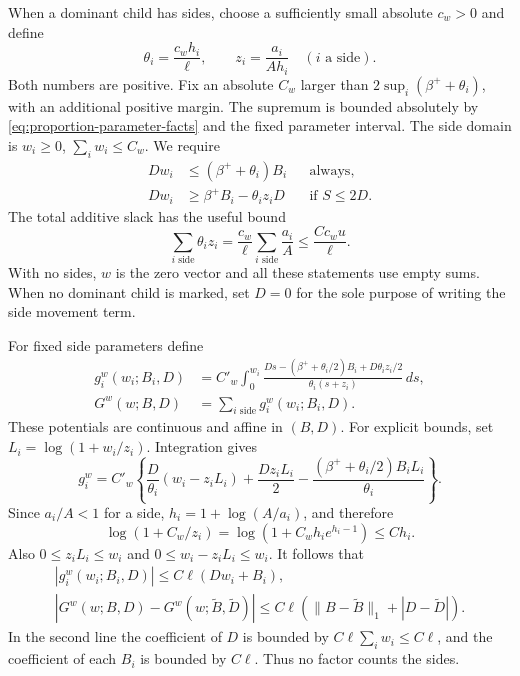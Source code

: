 When a dominant child has sides, choose a sufficiently small
absolute $c_w>0$ and define
\[
 \theta_i=\frac{c_w h_i}{\ell},\qquad
 z_i=\frac{a_i}{Ah_i}\quad(i\text{ a side}).
\]
Both numbers are positive.  Fix an absolute $C_w$ larger than
$2\sup_i(\beta^++\theta_i)$, with an additional positive margin.
The supremum is bounded absolutely by
\eqref{eq:proportion-parameter-facts} and the fixed parameter interval.
The side domain is $w_i\ge0$, $\sum_iw_i\le C_w$.
We require
\begin{equation}\label{eq:side-feasibility}
\begin{aligned}
 Dw_i&\le(\beta^++\theta_i)B_i&&\text{always},\\
 Dw_i&\ge\beta^+B_i-\theta_i z_iD&&\text{if }S\le2D.
\end{aligned}
\end{equation}
The total additive slack has the useful bound
\begin{equation}\label{eq:side-slack}
 \sum_{i\text{ side}}\theta_i z_i
      =\frac{c_w}{\ell}\sum_{i\text{ side}}\frac{a_i}{A}
      \le \frac{Cc_wu}{\ell}.
\end{equation}
With no sides, $w$ is the zero vector and all these statements use
empty sums.  When no dominant child is marked, set $D=0$ for the
sole purpose of writing the side movement term.

For fixed side parameters define
\begin{equation}\label{eq:side-primitive}
\begin{aligned}
 g_i^w(w_i;B_i,D)
  &=C'_w\int_0^{w_i}
       \frac{Ds-(\beta^++\theta_i/2)B_i+D\theta_i z_i/2}
            {\theta_i(s+z_i)}\,ds,\\
 G^w(w;B,D)&=\sum_{i\text{ side}}g_i^w(w_i;B_i,D).
\end{aligned}
\end{equation}
These potentials are continuous and affine in $(B,D)$.
For explicit bounds, set $L_i=\log(1+w_i/z_i)$.  Integration gives
\begin{equation}\label{eq:side-primitive-explicit}
 g_i^w=C'_w\left\{
   \frac{D}{\theta_i}(w_i-z_iL_i)
   +\frac{Dz_iL_i}{2}
   -\frac{(\beta^++\theta_i/2)B_iL_i}{\theta_i}
                    \right\}.
\end{equation}
Since $a_i/A<1$ for a side, $h_i=1+\log(A/a_i)$, and therefore
\[
 \log(1+C_w/z_i)
   =\log\left(1+C_wh_i e^{h_i-1}\right)\le Ch_i.
\]
Also $0\le z_iL_i\le w_i$ and
$0\le w_i-z_iL_i\le w_i$.  It follows that
\begin{equation}\label{eq:side-potential-bounds}
\begin{gathered}
 |g_i^w(w_i;B_i,D)|\le C\ell(Dw_i+B_i),\\
 |G^w(w;B,D)-G^w(w;\widetilde B,\widetilde D)|
   \le C\ell\left(\|B-\widetilde B\|_1+|D-\widetilde D|\right).
\end{gathered}
\end{equation}
In the second line the coefficient of $D$ is bounded by
$C\ell\sum_iw_i\le C\ell$, and the coefficient of each $B_i$
is bounded by $C\ell$.  Thus no factor counts the sides.

